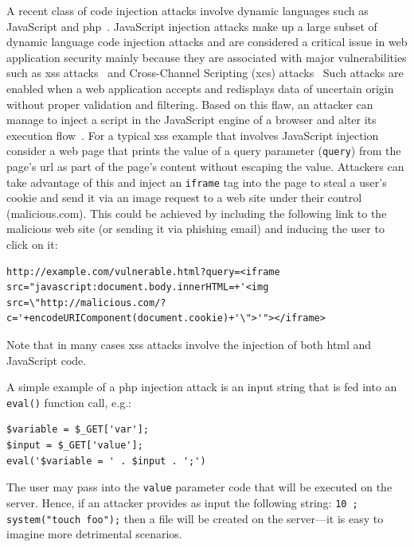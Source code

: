 \documentclass[conference]{IEEEtran}
\begin{document}
A recent class of code injection attacks involve dynamic languages
such as JavaScript and {\sc php}~\cite{SFVM09,SMS13}.
JavaScript injection attacks make up a large subset of dynamic
language code injection attacks and are considered a critical issue
in web application security mainly because they are associated with
major vulnerabilities such as {\sc xss} attacks~\cite{SG07} and
Cross-Channel Scripting ({\sc xcs}) attacks~\cite{W10,BBB09}
Such attacks are enabled when a web application accepts
and redisplays data of uncertain origin without
proper validation and filtering. Based on this flaw, an attacker
can manage to inject a script in the JavaScript engine of a browser
and alter its execution flow~\cite{ELX07}.
For a typical {\sc xss} example that involves JavaScript injection
consider a web page that prints the value
of a query parameter ({\tt query}) from the
page's {\sc url} as part of the page's content
without escaping the value. Attackers
can take advantage of this and inject an {\tt iframe} tag
into the page to steal a user's cookie and
send it via an image request to a web site
under their control (malicious.com).
This could be achieved by including the following
link to the malicious web site (or sending it via phishing
email) and inducing the user to click on it:

\lstset{language=HTML}
\begin{lstlisting}
http://example.com/vulnerable.html?query=<iframe src="javascript:document.body.innerHTML=+'<img src=\"http://malicious.com/?c='+encodeURIComponent(document.cookie)+'\">'"></iframe>
\end{lstlisting}

\noindent
Note that in many cases {\sc xss} attacks
involve the injection of both {\sc html} and JavaScript code.

A simple example of a {\sc php} injection attack is an input string
that is fed into an {\tt eval()} function call, e.g.:

\lstset{language=PHP}
\begin{lstlisting}
$variable = $_GET['var']; 
$input = $_GET['value'];
eval('$variable = ' . $input . ';')
\end{lstlisting}

\noindent
The user may pass into the {\tt value} parameter code that will
be executed on the server. Hence, if an attacker provides as
input the following string: {\tt 10 ; system("touch foo");}
then a file will be created on the server---it is easy
to imagine more detrimental scenarios.
\end{document}

